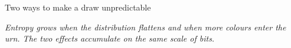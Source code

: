 \begin{frame}{Two ways to make a draw unpredictable}
\begin{center}
\begin{tikzpicture}
\end{tikzpicture}
\end{center}

\vspace{-1.1em}
\begin{center}
{\itshape\color{mutedWarmGray}\footnotesize
Entropy grows when the distribution flattens \emph{and} when more
colours enter the urn. The two effects accumulate on the same scale of bits.}
\end{center}

\end{frame}
